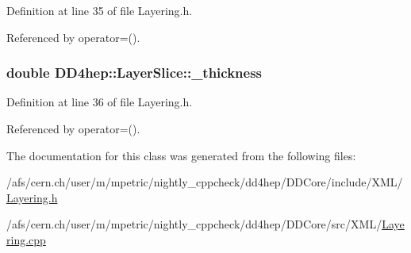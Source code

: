 Definition at line 35 of file Layering.h.

Referenced by operator=().\hypertarget{class_d_d4hep_1_1_layer_slice_ab67de3b92d55a6b6169a310c9f18d326}{
\subsubsection[{\_\-thickness}]{\setlength{\rightskip}{0pt plus 5cm}double {\bf DD4hep::LayerSlice::\_\-thickness}}}
\label{class_d_d4hep_1_1_layer_slice_ab67de3b92d55a6b6169a310c9f18d326}


Definition at line 36 of file Layering.h.

Referenced by operator=().

The documentation for this class was generated from the following files:\begin{DoxyCompactItemize}
\item 
/afs/cern.ch/user/m/mpetric/nightly\_\-cppcheck/dd4hep/DDCore/include/XML/\hyperlink{_layering_8h}{Layering.h}\item 
/afs/cern.ch/user/m/mpetric/nightly\_\-cppcheck/dd4hep/DDCore/src/XML/\hyperlink{_layering_8cpp}{Layering.cpp}\end{DoxyCompactItemize}
